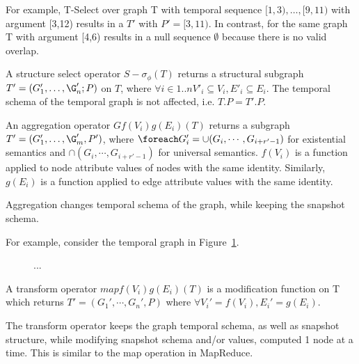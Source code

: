 \begin{itemize}
\begin{itemize}
\end{itemize}


For example, T-Select over graph T with temporal sequence
$[1,3),\ldots,[9,11)$ with argument [3,12) results in a $T'$ with $P'
      = [3,11)$.  In contrast, for the same graph T with argument
        [4,6) results in a null sequence $\emptyset$ because there is
          no valid overlap.

\begin{definition}
\label{def:ssel}
A structure select operator $S-\sigma_\phi(T)$ returns a structural
subgraph $T'= (G_1', \ldots, \G_n'; P)$ on $T$, where $\forall i \in
1..n V'_i \subseteq V_i, E'_i \subseteq E_i$. The temporal schema of
the temporal graph is not affected, i.e. $T.P = T'.P$.

\end{definition}

\begin{definition}
\label{def:agg}
An aggregation operator $G f(V_i) g(E_i) (T)$ returns a subgraph $T' =
(G_1', \ldots, \G_m', P')$, where $\foreach G_i' = \cup(G_{i}, \cdots,
G_{i+r'-1})$ for existential semantics and $\cap(G_{i}, \cdots,
G_{i+r'-1})$ for universal semantics.  $f(V_i)$ is a function applied
to node attribute values of nodes with the same identity.  Similarly,
$g(E_i)$ is a function applied to edge attribute values with the same
identity. 
\end{definition}

Aggregation changes temporal schema of the graph, while keeping the
snapshot schema.

For example, consider the temporal graph in Figure~\ref{fig:agg}.

\begin{figure}
\label{fig:agg}
\caption{...}
\end{figure}

\begin{definition}
\label{def:transform}
A transform operator $map f(V_i) g(E_i) (T)$ is a modification
function on T which returns $T' = (G_1', \cdots, G_n', P)$ where
$\forall V_i' = f(V_i), E_i' = g(E_i)$.
\end{definition}

The transform operator keeps the graph temporal schema, as well as
snapshot structure, while modifying snapshot schema and/or values,
computed 1 node at a time.  This is similar to the map operation in
MapReduce.

